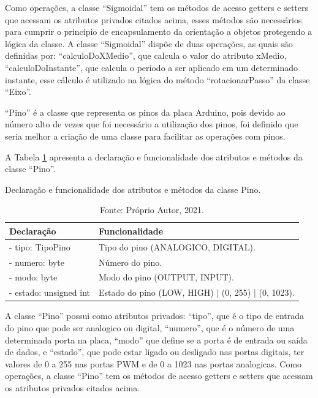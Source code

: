 Como operações, a classe “Sigmoidal” tem os métodos de acesso getters e setters que acessam os atributos 
privados citados acima, esses métodos são necessários para cumprir o princípio de encapsulamento da orientação 
a objetos protegendo a lógica da classe. A classe “Sigmoidal” dispõe de duas operações, as quais são definidas 
por: “calculoDoXMedio”, que calcula o valor do atributo xMedio, “calculoDoInstante”, que calcula o período a 
ser aplicado em um determinado instante, esse cálculo é utilizado na lógica do método “rotacionarPasso” 
da classe “Eixo”.

“Pino” é a classe que representa os pinos da placa Arduino, pois devido ao número alto de vezes que foi 
necessário a utilização dos pinos, foi definido que seria melhor a criação de uma classe para facilitar 
as operações com pinos. 

A Tabela \ref{tab:classepino} apresenta a declaração e funcionalidade dos atributos e métodos da 
classe “Pino”.

\begin{table}[H]
    \centering
    \caption{Declaração e funcionalidade dos atributos e métodos da classe Pino.}
    \begin{tabular}{lp{9cm}}
        \hline
        \textbf{Declaração} & \textbf{Funcionalidade}\\
        \hline
        - tipo: TipoPino & Tipo do pino (ANALOGICO, DIGITAL).\\
        - numero: byte & Número do pino.\\
        - modo: byte & Modo do pino (OUTPUT, INPUT).\\
        - estado: unsigned int & Estado do pino (LOW, HIGH) | (0, 255) | (0, 1023).\\
        \hline       
    \end{tabular}
    \caption*{Fonte: Próprio Autor, 2021.}
    \label{tab:classepino}
\end{table}

A classe “Pino” possui como atributos privados: “tipo”, que é o tipo de entrada do pino que pode ser 
analogico ou digital, “numero”, que é o número de uma determinada porta na placa, “modo” que define se 
a porta é de entrada ou saída de dados, e “estado”, que pode estar ligado ou desligado nas portas digitais, 
ter valores de 0 a 255 nas portas \ac{PWM} e de 0 a 1023 nas portas analogicas. Como operações, a classe “Pino” 
tem os métodos de acesso getters e setters que acessam os atributos privados citados acima.

